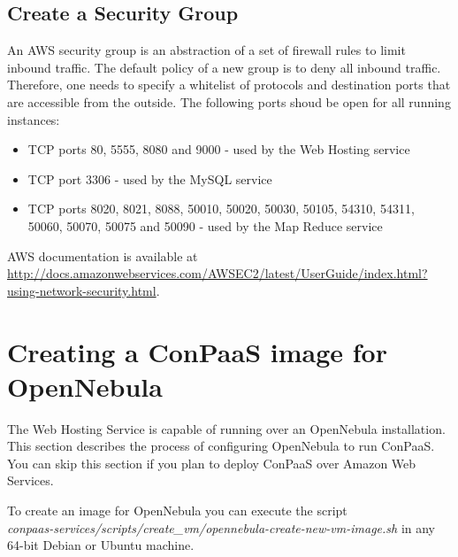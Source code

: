 \documentclass[10pt]{article}
\begin{document}
\subsection{Create a Security Group}

An AWS security group is an abstraction of a set of firewall rules to
limit inbound traffic. The default policy of a new group is to deny
all inbound traffic. Therefore, one needs to specify a whitelist of
protocols and destination ports that are accessible from the outside. 
The following ports shoud be open for all running instances: 
\begin{itemize}
\item TCP ports 80, 5555, 8080 and 9000 - used by the Web Hosting service
\item TCP port 3306 - used by the MySQL service
\item TCP ports 8020, 8021, 8088, 50010, 50020, 50030, 50105, 54310, 54311, 50060, 50070, 50075 and 50090 - used by the Map Reduce service 
\end{itemize}

AWS documentation is available at
\url{http://docs.amazonwebservices.com/AWSEC2/latest/UserGuide/index.html?using-network-security.html}.

\section{Creating a ConPaaS image for OpenNebula}
\label{sec:oneimage}

The Web Hosting Service is capable of running over an OpenNebula
installation. This section describes the process of configuring
OpenNebula to run ConPaaS. You can skip this section if you plan to
deploy ConPaaS over Amazon Web Services.

To create an image for OpenNebula you can execute the script\\
\textit{conpaas-services/scripts/create\_vm/opennebula-create-new-vm-image.sh} in any
64-bit Debian or Ubuntu machine.
\end{document}
